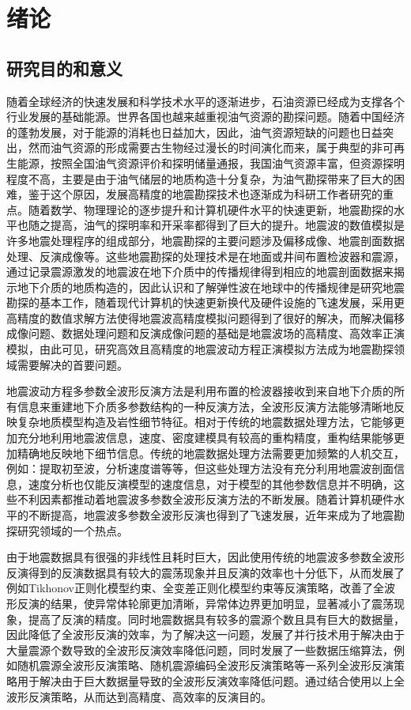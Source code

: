\documentclass[12pt]{article}
\newcommand{\upcite}[1]{\textsuperscript{\textsuperscript{\cite{#1}}}}
\begin{document}
\section{绪论}
\subsection{研究目的和意义}
随着全球经济的快速发展和科学技术水平的逐渐进步，石油资源已经成为支撑各个行业发展的基础能源。世界各国也越来越重视油气资源的勘探问题\upcite{HeXijun2015}。随着中国经济的蓬勃发展，对于能源的消耗也日益加大，因此，油气资源短缺的问题也日益突出，然而油气资源的形成需要古生物经过漫长的时间演化而来，属于典型的非可再生能源，按照全国油气资源评价和探明储量通报，我国油气资源丰富，但资源探明程度不高，主要是由于油气储层的地质构造十分复杂，为油气勘探带来了巨大的困难，鉴于这个原因，发展高精度的地震勘探技术也逐渐成为科研工作者研究的重点。随着数学、物理理论的逐步提升和计算机硬件水平的快速更新，地震勘探的水平也随之提高，油气的探明率和开采率都得到了巨大的提升。地震波的数值模拟是许多地震处理程序的组成部分，地震勘探的主要问题涉及偏移成像、地震剖面数据处理、反演成像等。这些地震勘探的处理技术是在地面或井间布置检波器和震源，通过记录震源激发的地震波在地下介质中的传播规律得到相应的地震剖面数据来揭示地下介质的地质构造的，因此认识和了解弹性波在地球中的传播规律是研究地震勘探的基本工作，随着现代计算机的快速更新换代及硬件设施的飞速发展，采用更高精度的数值求解方法使得地震波高精度模拟问题得到了很好的解决，而解决偏移成像问题、数据处理问题和反演成像问题的基础是地震波场的高精度、高效率正演模拟，由此可见，研究高效且高精度的地震波动方程正演模拟方法成为地震勘探领域需要解决的首要问题。
\par
地震波动方程多参数全波形反演方法是利用布置的检波器接收到来自地下介质的所有信息来重建地下介质多参数结构的一种反演方法，全波形反演方法能够清晰地反映复杂地质模型构造及岩性细节特征。相对于传统的地震数据处理方法，它能够更加充分地利用地震波信息，速度、密度建模具有较高的重构精度，重构结果能够更加精确地反映地下细节信息。传统的地震数据处理方法需要更加频繁的人机交互，例如：提取初至波，分析速度谱等等，但这些处理方法没有充分利用地震波剖面信息，速度分析也仅能反演模型的速度信息，对于模型的其他参数信息并不明确，这些不利因素都推动着地震波多参数全波形反演方法的不断发展。随着计算机硬件水平的不断提高，地震波多参数全波形反演也得到了飞速发展，近年来成为了地震勘探研究领域的一个热点。
\par
由于地震数据具有很强的非线性且耗时巨大，因此使用传统的地震波多参数全波形反演得到的反演数据具有较大的震荡现象并且反演的效率也十分低下，从而发展了例如Tikhonov正则化模型约束、全变差正则化模型约束等反演策略，改善了全波形反演的结果，使异常体轮廓更加清晰，异常体边界更加明显，显著减小了震荡现象，提高了反演的精度。同时地震数据具有较多的震源个数且具有巨大的数据量，因此降低了全波形反演的效率，为了解决这一问题，发展了并行技术用于解决由于大量震源个数导致的全波形反演效率降低问题，同时发展了一些数据压缩算法，例如随机震源全波形反演策略、随机震源编码全波形反演策略等一系列全波形反演策略用于解决由于巨大数据量导致的全波形反演效率降低问题。通过结合使用以上全波形反演策略，从而达到高精度、高效率的反演目的。
\end{document}
